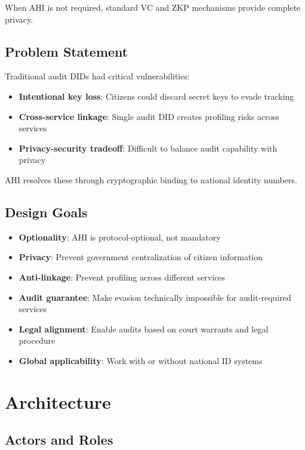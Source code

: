 When AHI is not required, standard VC and ZKP mechanisms provide complete privacy.

\subsection{Problem Statement}

Traditional audit DIDs had critical vulnerabilities:

\begin{itemize}
  \item \textbf{Intentional key loss}: Citizens could discard secret keys to evade tracking
  \item \textbf{Cross-service linkage}: Single audit DID creates profiling risks across services
  \item \textbf{Privacy-security tradeoff}: Difficult to balance audit capability with privacy
\end{itemize}

AHI resolves these through cryptographic binding to national identity numbers.

\subsection{Design Goals}

\begin{itemize}
  \item \textbf{Optionality}: AHI is protocol-optional, not mandatory
  \item \textbf{Privacy}: Prevent government centralization of citizen information
  \item \textbf{Anti-linkage}: Prevent profiling across different services
  \item \textbf{Audit guarantee}: Make evasion technically impossible for audit-required services
  \item \textbf{Legal alignment}: Enable audits based on court warrants and legal procedure
  \item \textbf{Global applicability}: Work with or without national ID systems
\end{itemize}

\section{Architecture}

\subsection{Actors and Roles}

